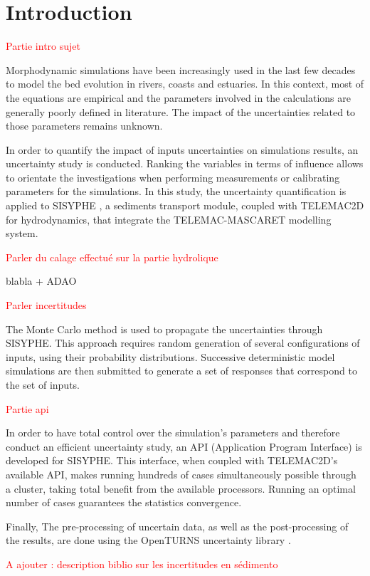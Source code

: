 \section{Introduction}
\textcolor{red}{Partie intro sujet}

Morphodynamic simulations have been increasingly used in the last few decades to model the bed evolution in rivers, coasts and estuaries. In this context, most of the equations are empirical and the parameters involved in the calculations are generally poorly defined in literature. The impact of the uncertainties related to those parameters remains unknown. 

In order to quantify the impact of inputs uncertainties on simulations results, an uncertainty study is conducted. Ranking the variables in terms of influence allows to orientate the investigations when performing measurements or calibrating parameters for the simulations. In this study, the uncertainty quantification is applied to SISYPHE \cite{bib7}, a sediments transport module, coupled with TELEMAC2D \cite{bib12} for hydrodynamics, that integrate the TELEMAC-MASCARET modelling system.

\textcolor{red}{Parler du calage effectué sur la partie hydrolique}

blabla  + ADAO

\textcolor{red}{Parler incertitudes}

The Monte Carlo method is used to propagate the 
uncertainties through SISYPHE. This approach requires random generation of several configurations of inputs, using their probability  distributions. Successive deterministic model simulations are then submitted to generate a set of responses that correspond to the set of inputs. 

\textcolor{red}{Partie api}

In order to have total control over the simulation's parameters and therefore conduct an efficient uncertainty study, an API (Application Program Interface) is developed for SISYPHE. This interface, when coupled with TELEMAC2D's available API, makes running hundreds of cases simultaneously possible through a cluster, taking total benefit from the available processors. Running an optimal number of cases guarantees the statistics convergence. 

Finally, The pre-processing of uncertain data, as well as the post-processing of the results, are done using the OpenTURNS uncertainty library \cite{bib11}. 

\textcolor{red}{A ajouter : description biblio sur les incertitudes en sédimento}

